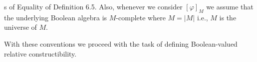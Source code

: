 s of Equality of Definition 6.5. Also, whenever we consider $[\varphi]_M$ we assume that the underlying Boolean algebra is $M$-complete where $M = |M|$ i.e., $M$ is the universe of $M$.

With these conventions we proceed with the task of defining Boolean-valued relative constructibility.
